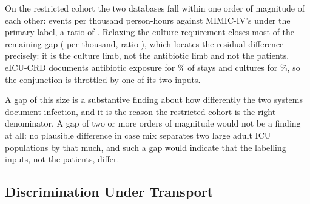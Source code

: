 On the restricted cohort the two databases fall within one order of magnitude
of each other: \pcExtRateEicuB{} events per thousand person-hours against
MIMIC-IV's \pcExtRateMimicB{} under the primary label, a ratio of
\pcExtRateRatioB. Relaxing the culture requirement closes most of the remaining
gap (\pcExtRateEicuAbxB{} per thousand, ratio \pcExtRateRatioAbxB),
which locates the residual difference precisely: it is the culture limb, not
the antibiotic limb and not the patients. eICU-CRD documents antibiotic
exposure for \pcExtAbxCoverage\% of stays and cultures for
\pcExtMicroCoverage\%, so the conjunction is throttled by one of its two
inputs.

A gap of this size is a substantive finding about how differently the two
systems document infection, and it is the reason the restricted cohort is the
right denominator. A gap of two or more orders of magnitude would not be a
finding at all: no plausible difference in case mix separates two large adult
ICU populations by that much, and such a gap would indicate that the labelling
inputs, not the patients, differ.

\subsection{Discrimination Under Transport}

